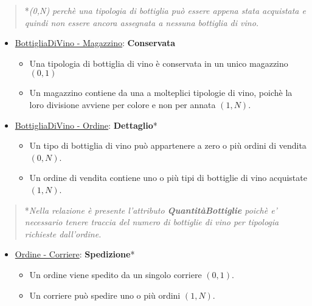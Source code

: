\begin{verse}
	*\emph{(0,N) perchè una tipologia di bottiglia può essere appena stata acquistata e quindi non essere ancora assegnata a nessuna bottiglia di vino.}
\end{verse}

\begin{itemize}
	\item \underline{BottigliaDiVino - Magazzino}: \textbf{Conservata}
	
	\begin{itemize}
		\item Una tipologia di bottiglia di vino è conservata in un unico magazzino $(0,1)$
		\item Un magazzino contiene da una a molteplici tipologie di vino, poichè la loro divisione avviene per colore e non per annata $(1,N)$.
	\end{itemize}
	
\end{itemize}

\begin{itemize}
	\item \underline{BottigliaDiVino - Ordine}: \textbf{Dettaglio}*
	
	\begin{itemize}
		\item Un tipo di bottiglia di vino può appartenere a zero o più ordini di vendita $(0,N)$.
		\item Un ordine di vendita contiene uno o più tipi di bottiglie di vino acquistate $(1,N)$.
	\end{itemize}
	
\end{itemize}

\begin{verse}
	*\emph{Nella relazione è presente l'attributo \textbf{QuantitàBottiglie} poichè e' necessario tenere traccia del numero di bottiglie di vino per tipologia richieste dall'ordine.}
\end{verse}

\begin{itemize}
	\item \underline{Ordine - Corriere}: \textbf{Spedizione}*
	
	\begin{itemize}
		\item Un ordine viene spedito da un singolo corriere $(0,1)$.
		\item Un corriere può spedire uno o più ordini $(1,N)$.
	\end{itemize}
	
\end{itemize}

